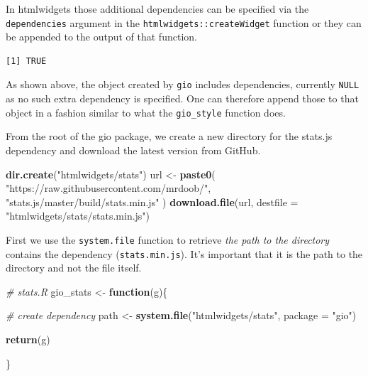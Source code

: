 \documentclass[10pt,]{krantz}
\makeatletter
\newenvironment{Shaded}{\begin{snugshade}}{\end{snugshade}}
\newcommand{\CommentTok}[1]{\textcolor[rgb]{0.37,0.37,0.37}{\textit{#1}}}
\newcommand{\ControlFlowTok}[1]{\textcolor[rgb]{0.27,0.27,0.27}{\textbf{#1}}}
\newcommand{\DataTypeTok}[1]{\textcolor[rgb]{0.27,0.27,0.27}{#1}}
\newcommand{\KeywordTok}[1]{\textcolor[rgb]{0.27,0.27,0.27}{\textbf{#1}}}
\newcommand{\NormalTok}[1]{#1}
\newcommand{\OperatorTok}[1]{\textcolor[rgb]{0.43,0.43,0.43}{\textbf{#1}}}
\newcommand{\StringTok}[1]{\textcolor[rgb]{0.5,0.5,0.5}{#1}}
\newenvironment{kframe}{%
\medskip{}
\setlength{\fboxsep}{.8em}
 \def\at@end@of@kframe{}%
 \ifinner\ifhmode%
  \def\at@end@of@kframe{\end{minipage}}%
  \begin{minipage}{\columnwidth}%
 \fi\fi%
 \def\FrameCommand##1{\hskip\@totalleftmargin \hskip-\fboxsep
 \colorbox{shadecolor}{##1}\hskip-\fboxsep
     \hskip-\linewidth \hskip-\@totalleftmargin \hskip\columnwidth}%
 \MakeFramed {\advance\hsize-\width
   \@totalleftmargin\z@ \linewidth\hsize
   \@setminipage}}%
 {\par\unskip\endMakeFramed%
 \at@end@of@kframe}
\renewenvironment{Shaded}{\begin{kframe}}{\end{kframe}}
\makeatother
\begin{document}
In htmlwidgets those additional dependencies can be specified via the \texttt{dependencies} argument in the \texttt{htmlwidgets::createWidget} function or they can be appended to the output of that function.

\begin{Shaded}
\end{Shaded}

\begin{verbatim}
[1] TRUE
\end{verbatim}

As shown above, the object created by \texttt{gio} includes dependencies, currently \texttt{NULL} as no such extra dependency is specified. One can therefore append those to that object in a fashion similar to what the \texttt{gio\_style} function does.

From the root of the gio package, we create a new directory for the stats.js dependency and download the latest version from GitHub.

\begin{Shaded}
\begin{Highlighting}[]
\KeywordTok{dir.create}\NormalTok{(}\StringTok{"htmlwidgets/stats"}\NormalTok{)}
\NormalTok{url <-}\StringTok{ }\KeywordTok{paste0}\NormalTok{(}
  \StringTok{"https://raw.githubusercontent.com/mrdoob/"}\NormalTok{,}
  \StringTok{"stats.js/master/build/stats.min.js"}
\NormalTok{)}
\KeywordTok{download.file}\NormalTok{(url, }\DataTypeTok{destfile =} \StringTok{"htmlwidgets/stats/stats.min.js"}\NormalTok{)}
\end{Highlighting}
\end{Shaded}

First we use the \texttt{system.file} function to retrieve \emph{the path to the directory} contains the dependency (\texttt{stats.min.js}). It's important that it is the path to the directory and not the file itself.

\begin{Shaded}
\begin{Highlighting}[]
\CommentTok{# stats.R}
\NormalTok{gio_stats <-}\StringTok{ }\ControlFlowTok{function}\NormalTok{(g)\{}

  \CommentTok{# create dependency}
\NormalTok{  path <-}\StringTok{ }\KeywordTok{system.file}\NormalTok{(}\StringTok{"htmlwidgets/stats"}\NormalTok{, }\DataTypeTok{package =} \StringTok{"gio"}\NormalTok{)}

  \KeywordTok{return}\NormalTok{(g)}

\NormalTok{\}}
\end{Highlighting}
\end{Shaded}
\end{document}
